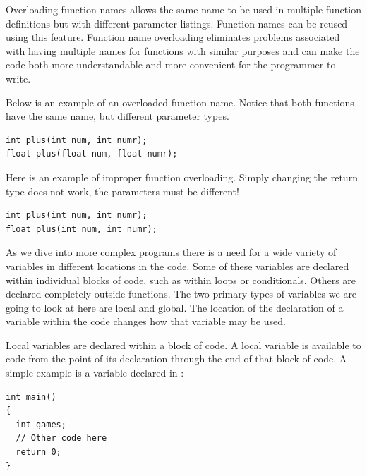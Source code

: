 
Overloading function names allows the same name to be used in multiple function definitions but with different parameter listings. 
Function names can be reused using this feature. 
Function name overloading eliminates problems associated with having multiple names for functions with similar purposes and can make the code both more understandable and more convenient for the programmer to write.

Below is an example of an overloaded function name. 
Notice that both functions have the same name, but different parameter types.

\noindent\begin{minipage}{\linewidth}\begin{lstlisting}
int plus(int num, int numr);
float plus(float num, float numr);
\end{lstlisting}\end{minipage}

Here is an example of improper function overloading. 
Simply changing the return type does not work, the parameters must be different!

\noindent\begin{minipage}{\linewidth}\begin{lstlisting}
int plus(int num, int numr);
float plus(int num, int numr);  
\end{lstlisting}\end{minipage}



As we dive into more complex programs there is a need for a wide variety of variables in different locations in the code. 
Some of these variables are declared within individual blocks of code, such as within loops or conditionals. 
Others are declared completely outside functions. 
The two primary types of variables we are going to look at here are local and global. 
The location of the declaration of a variable within the code changes how that variable may be used.
	
Local variables are declared within a block of code. 
A local variable is available to code from the point of its declaration through the end of that block of code. 
A simple example is a variable declared in :

\noindent\begin{minipage}{\linewidth}\begin{lstlisting}
int main()
{
  int games;
  // Other code here
  return 0;
}
\end{lstlisting}\end{minipage}

